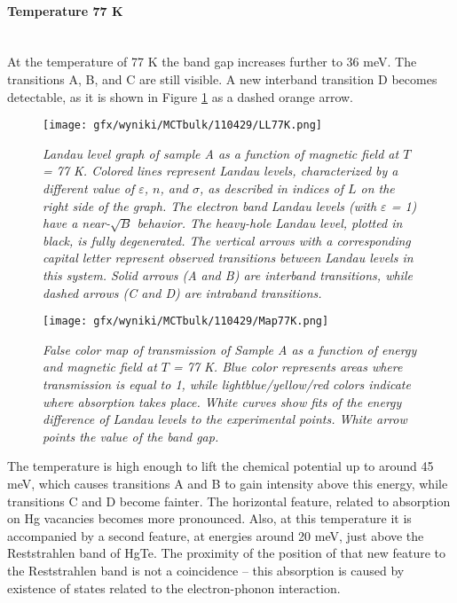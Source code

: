 \documentclass[titlepage,a4paper]{book}
\newcommand{\wciecie}{\quad\phantom{v}}
\newcommand{\myparagraph}[1]{\paragraph{#1}\mbox{}\\}
\begin{document}
\myparagraph{Temperature 77 K}
\wciecie
At the temperature of 77 K the band gap increases further to 36 meV. The transitions A, B, and C are still visible. A new interband transition D becomes detectable, as it is shown in Figure \ref{fig:LL_110429_77K} as a dashed orange arrow.
\begin{figure}[H]
	\centering
	\texttt{[image: gfx/wyniki/MCTbulk/110429/LL77K.png]}
	\vspace{-10pt}
	\caption{\textit{Landau level graph of sample A as a function of magnetic field at $T$ = 77 K. Colored lines represent Landau levels, characterized by a different value of $\varepsilon$, $n$, and $\sigma$, as described in indices of $L$ on the right side of the graph. The electron band Landau levels (with $\varepsilon$ = 1) have a near-$\sqrt{B}$ behavior. The heavy-hole Landau level, plotted in black, is fully degenerated. The vertical arrows with a corresponding capital letter represent observed transitions between Landau levels in this system. Solid arrows (A and B) are interband transitions, while dashed arrows (C and D) are intraband transitions.}}
	\label{fig:LL_110429_77K}
\end{figure}

\begin{figure}[ht]
	\centering
	\texttt{[image: gfx/wyniki/MCTbulk/110429/Map77K.png]}
	\vspace{-10pt}
	\caption{\textit{False color map of transmission of Sample A as a function of energy and magnetic field at $T$ = 77 K. Blue color represents areas where transmission is equal to 1, while lightblue/yellow/red colors indicate where absorption takes place. White curves show fits of the energy difference of Landau levels to the experimental points. White arrow points the value of the band gap.}}
	\label{fig:Map_110429_77K}
\end{figure} 

The temperature is high enough to lift the chemical potential up to around 45 meV, which causes transitions A and B to gain intensity above this energy, while transitions C and D become fainter. The horizontal feature, related to absorption on Hg vacancies becomes more pronounced. Also, at this temperature it is accompanied by a second feature, at energies around 20 meV, just above the Reststrahlen band of HgTe. The proximity of the position of that new feature to the Reststrahlen band is not a coincidence -- this absorption is caused by existence of states related to the electron-phonon interaction.
\end{document}
